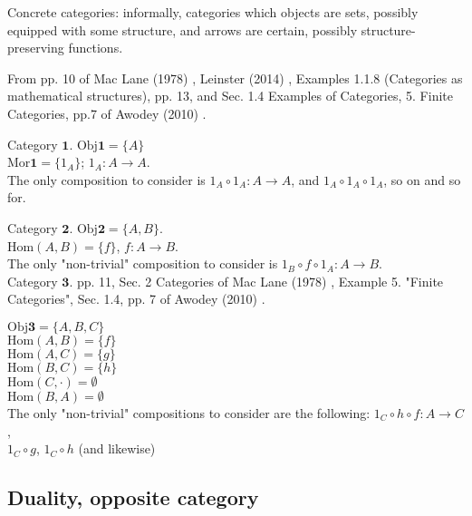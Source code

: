 \documentclass[10pt]{amsart}
\begin{document}
\begin{multicols*}{2}
Concrete categories: informally, categories which objects are sets, possibly equipped with some structure, and arrows are certain, possibly structure-preserving functions.

From pp. 10 of Mac Lane (1978) \cite{MacL1978}, Leinster (2014) \cite{Lein2014}, Examples 1.1.8 (Categories as mathematical structures), pp. 13, and Sec. 1.4 Examples of Categories, 5. Finite Categories, pp.7 of Awodey (2010) \cite{Awod2010}.

Category $\mathbf{1}$.  $\text{Obj}{\mathbf{1}} = \lbrace A \rbrace$ \\
$\text{Mor}{\mathbf{1}} = \lbrace 1_A \rbrace$; $1_A : A \to A$.  \\

The only composition to consider is $1_A \circ 1_A : A \to A$, and $1_A \circ 1_A \circ 1_A$, so on and so for.

Category $\mathbf{2}$.  $\text{Obj}{\mathbf{2}} = \lbrace A, B \rbrace$. \\
$\text{Hom}(A, B) = \lbrace f \rbrace$, $f:A\to B$. \\

The only "non-trivial" composition to consider is $1_B \circ f \circ 1_A : A \to B$. \\
 
Category $\mathbf{3}$. pp. 11, Sec. 2 Categories of Mac Lane (1978) \cite{MacL1978}, Example 5. "Finite Categories", Sec. 1.4, pp. 7 of Awodey (2010) \cite{Awod2010}. 

$\text{Obj}{\mathbf{3}} = \lbrace A, B, C \rbrace$ \\
$\text{Hom}{(A, B)} = \lbrace f \rbrace$ \\
$\text{Hom}{(A, C)} = \lbrace g \rbrace$ \\
$\text{Hom}{(B, C)} = \lbrace h \rbrace$ \\
$\text{Hom}{(C, \cdot)} = \emptyset $ \\
$\text{Hom}{(B, A)} = \emptyset$ \\

The only "non-trivial" compositions to consider are the following:
$1_C \circ h \circ f : A \to C$, \\
$1_C \circ g$, $1_C \circ h$ (and likewise) \\


\subsection{Duality, opposite category}


\end{multicols*}
\end{document}
